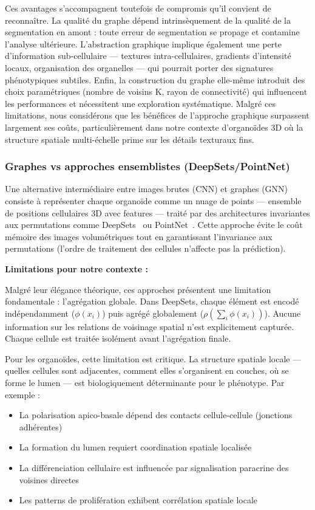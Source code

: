 Ces avantages s'accompagnent toutefois de compromis qu'il convient de reconnaître. La qualité du graphe dépend intrinsèquement de la qualité de la segmentation en amont : toute erreur de segmentation se propage et contamine l'analyse ultérieure. L'abstraction graphique implique également une perte d'information sub-cellulaire — textures intra-cellulaires, gradients d'intensité locaux, organisation des organelles — qui pourrait porter des signatures phénotypiques subtiles. Enfin, la construction du graphe elle-même introduit des choix paramétriques (nombre de voisins K, rayon de connectivité) qui influencent les performances et nécessitent une exploration systématique. Malgré ces limitations, nous considérons que les bénéfices de l'approche graphique surpassent largement ses coûts, particulièrement dans notre contexte d'organoïdes 3D où la structure spatiale multi-échelle prime sur les détails texturaux fins.

\subsubsection{Graphes vs approches ensemblistes (DeepSets/PointNet)}

Une alternative intermédiaire entre images brutes (CNN) et graphes (GNN) consiste à représenter chaque organoïde comme un nuage de points — ensemble de positions cellulaires 3D avec features — traité par des architectures invariantes aux permutations comme DeepSets~\cite{Zaheer2017} ou PointNet~\cite{Qi2017}. Cette approche évite le coût mémoire des images volumétriques tout en garantissant l'invariance aux permutations (l'ordre de traitement des cellules n'affecte pas la prédiction).

\textbf{Limitations pour notre contexte :}

Malgré leur élégance théorique, ces approches présentent une limitation fondamentale : l'agrégation globale. Dans DeepSets, chaque élément est encodé indépendamment ($\phi(x_i)$) puis agrégé globalement ($\rho(\sum_i \phi(x_i))$). Aucune information sur les relations de voisinage spatial n'est explicitement capturée. Chaque cellule est traitée isolément avant l'agrégation finale.

Pour les organoïdes, cette limitation est critique. La structure spatiale locale — quelles cellules sont adjacentes, comment elles s'organisent en couches, où se forme le lumen — est biologiquement déterminante pour le phénotype. Par exemple :
\begin{itemize}
    \item La polarisation apico-basale dépend des contacts cellule-cellule (jonctions adhérentes)
    \item La formation du lumen requiert coordination spatiale localisée
    \item La différenciation cellulaire est influencée par signalisation paracrine des voisines directes
    \item Les patterns de prolifération exhibent corrélation spatiale locale
\end{itemize}

